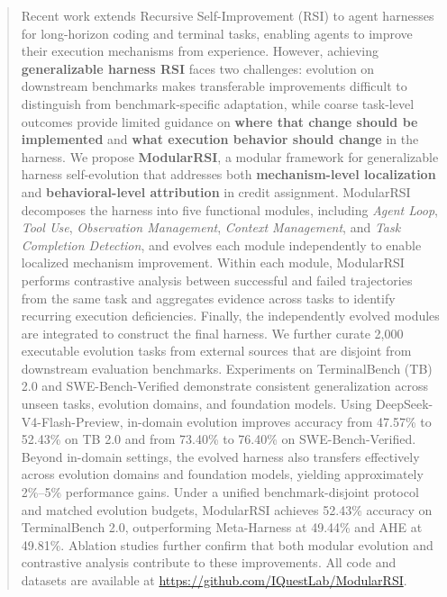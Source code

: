 \documentclass{article} %
\begin{document}
\begin{abstract}
Recent work extends Recursive Self-Improvement (RSI) to agent harnesses for long-horizon coding and terminal tasks, enabling agents to improve their execution mechanisms from experience. However, achieving \textbf{generalizable harness RSI} faces two challenges: evolution on downstream benchmarks makes transferable improvements difficult to distinguish from benchmark-specific adaptation, while coarse task-level outcomes provide limited guidance on \textbf{where that change should be implemented} and \textbf{what execution behavior should change} in the harness.
We propose \textbf{ModularRSI}, a modular framework for generalizable harness self-evolution that addresses both \textbf{mechanism-level localization} and \textbf{behavioral-level attribution} in credit assignment.
ModularRSI decomposes the harness into five functional modules, including \textit{Agent Loop}, \textit{Tool Use}, \textit{Observation Management}, \textit{Context Management}, and \textit{Task Completion Detection}, and evolves each module independently to enable localized mechanism improvement.
Within each module, ModularRSI performs contrastive analysis between successful and failed trajectories from the same task and aggregates evidence across tasks to identify recurring execution deficiencies.
Finally, the independently evolved modules are integrated to construct the final harness.
We further curate 2,000 executable evolution tasks from external sources that are disjoint from downstream evaluation benchmarks.
Experiments on TerminalBench (TB) 2.0 and SWE-Bench-Verified demonstrate consistent generalization across unseen tasks, evolution domains, and foundation models. Using DeepSeek-V4-Flash-Preview, in-domain evolution improves accuracy from 47.57\% to 52.43\% on TB 2.0 and from 73.40\% to 76.40\% on SWE-Bench-Verified. Beyond in-domain settings, the evolved harness also transfers effectively across evolution domains and foundation models, yielding approximately 2\%--5\% performance gains. Under a unified benchmark-disjoint protocol and matched evolution budgets, ModularRSI achieves 52.43\% accuracy on TerminalBench 2.0, outperforming Meta-Harness at 49.44\% and AHE at 49.81\%. Ablation studies further confirm that both modular evolution and contrastive analysis contribute to these improvements.
All code and datasets are available at \url{https://github.com/IQuestLab/ModularRSI}.



\end{abstract}
\end{document}
